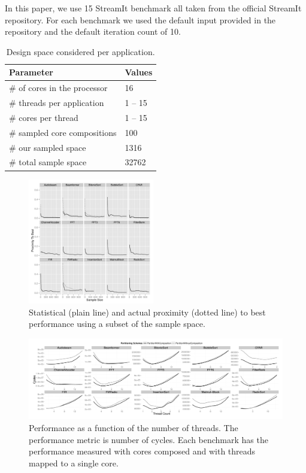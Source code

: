 In this paper, we use 15 StreamIt benchmark  all taken from the official StreamIt repository.
For each benchmark we used the default input provided in the repository and the default iteration count of 10. 
\begin{table}
\centering
\begin{tabular} { p{5.2cm}  p{1.8cm} }
      \toprule
      \textbf{Parameter} & \textbf{Values} \\ \midrule
      \# of cores in the processor & 16 \\
      \# threads per application & 1 -- 15 \\
      \# cores per thread & 1 -- 15 \\ \midrule
      \# sampled core compositions & 100 \\ 
      \# our sampled space & 1316 \\
      \# total sample space & 32762 \\ \bottomrule
    \end{tabular}
  \caption{Design space considered per application.}
  \label{tab:space}
\vspace{5mm}
\end{table}

\begin{figure}[t]
  \centering
    \includegraphics[width=0.49\textwidth]{streamit-paper/graphics/ESCProx.pdf}
    \caption{Statistical (plain line) and actual proximity (dotted line) to best performance using a subset of the sample space.}\label{fig:prox}
\end{figure}

\begin{figure}[t]
 \centering
    \includegraphics[width=1\textwidth]{streamit-paper/graphics/threadingmaybe.pdf}
    \caption{Performance as a function of the number of threads. The performance metric is number of cycles. Each benchmark has the performance measured with cores composed and with threads mapped to a single core.}\label{fig:threadtrend}
\end{figure}

